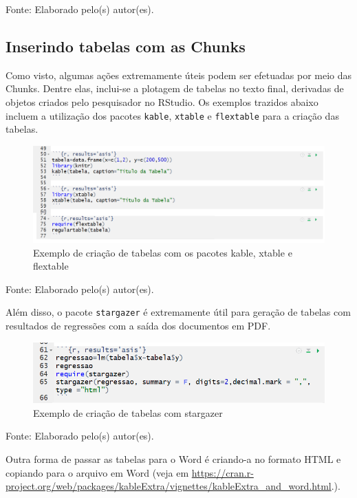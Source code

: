 \documentclass[12pt,brazil,]{book}
\begin{document}
Fonte: Elaborado pelo(s) autor(es).

\hypertarget{inserindo-tabelas-com-as-chunks}{%
\subsection{Inserindo tabelas com as
Chunks}\label{inserindo-tabelas-com-as-chunks}}

Como visto, algumas ações extremamente úteis podem ser efetuadas por
meio das Chunks. Dentre elas, inclui-se a plotagem de tabelas no texto
final, derivadas de objetos criados pelo pesquisador no RStudio. Os
exemplos trazidos abaixo incluem a utilização dos pacotes
\texttt{kable}, \texttt{xtable} e \texttt{flextable} para a criação das
tabelas.

\begin{figure}

{\centering \includegraphics[width=0.6\linewidth]{rmarkchunktab1} 

}

\caption{Exemplo de criação de tabelas com os pacotes kable, xtable e flextable}\label{fig:rmarkchunk31}
\end{figure}

Fonte: Elaborado pelo(s) autor(es).

Além disso, o pacote \texttt{stargazer} é extremamente útil para geração
de tabelas com resultados de regressões com a saída dos documentos em
PDF.

\begin{figure}

{\centering \includegraphics[width=0.6\linewidth]{rmarkchunktab2} 

}

\caption{Exemplo de criação de tabelas com stargazer}\label{fig:rmarkchunk33}
\end{figure}

Fonte: Elaborado pelo(s) autor(es).

Outra forma de passar as tabelas para o Word é criando-a no formato HTML
e copiando para o arquivo em Word (veja em
\url{https://cran.r-project.org/web/packages/kableExtra/vignettes/kableExtra_and_word.html}.).
\end{document}
